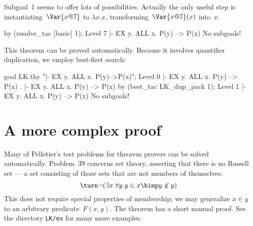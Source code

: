 Subgoal~1 seems to offer lots of possibilities.  Actually the only useful
step is instantiating~$\Var{x@7}$ to $\lambda x.x$,
transforming~$\Var{x@7}(x)$ into~$x$.
\begin{ttbox}
by (resolve_tac [basic] 1);
{\out Level 7}
{\out  |- EX y. ALL x. P(y) --> P(x)}
{\out No subgoals!}
\end{ttbox}
This theorem can be proved automatically.  Because it involves quantifier
duplication, we employ best-first search:
\begin{ttbox}
goal LK.thy "|- EX y. ALL x. P(y)-->P(x)";
{\out Level 0}
{\out  |- EX y. ALL x. P(y) --> P(x)}
{.  |- EX y. ALL x. P(y) --> P(x)}
by (best_tac LK_dup_pack 1);
{\out Level 1}
{\out  |- EX y. ALL x. P(y) --> P(x)}
{\out No subgoals!}
\end{ttbox}



\section{A more complex proof}
Many of Pelletier's test problems for theorem provers \cite{pelletier86}
can be solved automatically.  Problem~39 concerns set theory, asserting
that there is no Russell set --- a set consisting of those sets that are
not members of themselves:
\[  \turn \neg (\exists x. \forall y. y\in x \bimp y\not\in y) \]
This does not require special properties of membership; we may
generalize $x\in y$ to an arbitrary predicate~$F(x,y)$.  The theorem has a
short manual proof.  See the directory {\tt LK/ex} for many more
examples.

